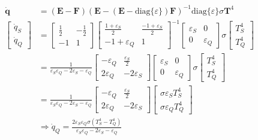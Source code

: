 \begin{align*}
	\dot{\textbf{q}} &= (\textbf{E} - \textbf{F})(\textbf{E} - (\textbf{E} - \text{diag}\{\varepsilon\})\textbf{F})^{-1}\text{diag}\{\varepsilon\}\sigma\textbf{T}^4 \\
	\begin{bmatrix}
		\dot{q}_S \\
		\dot{q}_Q
	\end{bmatrix}&=\begin{bmatrix}
		\frac{1}{2} & - \frac{1}{2} \\
		-1 & 1
	\end{bmatrix}
	\begin{bmatrix}
		\frac{1 + \varepsilon_S}{2} & \frac{-1 + \varepsilon_S}{2} \\
		-1 + \varepsilon_Q	&	1
	\end{bmatrix}^{-1}
	\begin{bmatrix}
		\varepsilon_S	&	0\\
		0	&	\varepsilon_Q		
	\end{bmatrix}
	\sigma
	\begin{bmatrix}
		T_S^4 \\
		T_Q^4
	\end{bmatrix}
	\\
	&= \frac{1}{\varepsilon_S\varepsilon_Q - 2\varepsilon_S - \varepsilon_Q}
	\begin{bmatrix}
		-\varepsilon_Q & \frac{\varepsilon_S}{2} \\
		2\varepsilon_Q & -2\varepsilon_S
	\end{bmatrix}
	\begin{bmatrix}
	\varepsilon_S	&	0\\
	0	&	\varepsilon_Q		
	\end{bmatrix}
	\sigma
	\begin{bmatrix}
	T_S^4 \\
	T_Q^4
	\end{bmatrix}
	\\
	&= \frac{1}{\varepsilon_S\varepsilon_Q - 2\varepsilon_S - \varepsilon_Q}
	\begin{bmatrix}
	-\varepsilon_Q & \frac{\varepsilon_S}{2} \\
	2\varepsilon_Q & -2\varepsilon_S
	\end{bmatrix}
	\begin{bmatrix}
		\sigma\varepsilon_ST_S^4 \\
		\sigma\varepsilon_QT_Q^4
	\end{bmatrix}
	\\
	& \Rightarrow \dot{q}_Q = \frac{2\varepsilon_S\varepsilon_Q\sigma(T_S^4 - T_Q^4)}{\varepsilon_S\varepsilon_Q - 2\varepsilon_S - \varepsilon_Q}
\end{align*}
